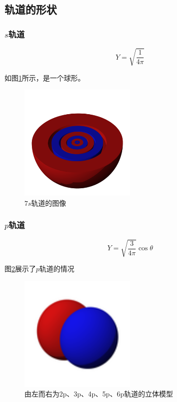 \subsection{轨道的形状}

\subsubsection{$s$轨道}

\begin{equation*}
    Y = \sqrt{\frac{1}{4\pi}}
\end{equation*}

如图\ref{fig:s_orbital}所示，是一个球形。

\begin{figure}[h]
    \centering
    \includegraphics[width=0.5\textwidth]{images/400px-S7M0.png}
    \caption{$7s$轨道的图像}
    \label{fig:s_orbital}
\end{figure}

\subsubsection{$p$轨道}

\begin{equation*}
    Y = \sqrt{\frac{3}{4\pi}} \cos \theta
\end{equation*}

图\ref{fig:p_orbital}展示了$p$轨道的情况

\begin{figure}[h]
    \centering
    \includegraphics[width=0.5\textwidth]{images/P2y.png}
    \caption{由左而右为2p、3p、4p、5p、6p轨道的立体模型}
    \label{fig:p_orbital}
\end{figure}



